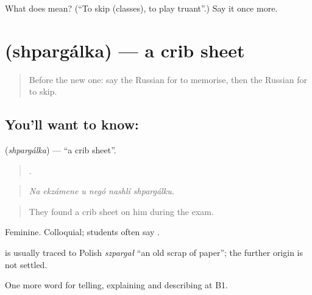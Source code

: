 \begin{tcolorbox}[breakable,colback=teal!4,colframe=teal!35!black,title={Before you move on}]
What does  mean? (\textquotedblleft{}To skip (classes), to play truant\textquotedblright{}.) Say it once more.
\end{tcolorbox}
\section[\texorpdfstring{\ru{шпаргалка} (shpargálka)}{шпаргалка (shpargálka)}]{ (shpargálka) — a crib sheet}

\label{lesson:RU-C384-shpargalka}



\begin{quote}
Before the new one: say the Russian for to memorise, then the Russian for to skip.
\end{quote}

\subsection*{You'll want to know: }
\textbf{} (\emph{shpargálka}) — \textquotedblleft{}a crib sheet\textquotedblright{}.

\begin{quote}
     .
\end{quote}

\begin{quote}
\emph{Na ekzámene u negó nashlí shpargálku.}
\end{quote}

\begin{quote}
They found a crib sheet on him during the exam.
\end{quote}

Feminine. Colloquial; students often say \emph{}.

\begin{cousinweb}
\textbf{} is usually traced to Polish \emph{szpargał} \textquotedblleft{}an old scrap of paper\textquotedblright{}; the further origin is not settled.
\end{cousinweb}

\begin{grammarlens}[title={What you've built}]
One more word for telling, explaining and describing at B1.
\end{grammarlens}

